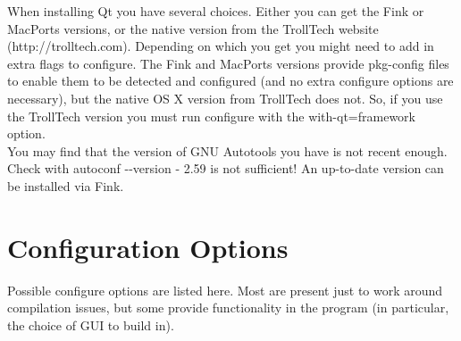When installing Qt you have several choices. Either you can get the Fink or MacPorts versions, or the native version from the TrollTech website (http://trolltech.com). Depending on which you get you might need to add in extra flags to {\sffamily configure}. The Fink and MacPorts versions provide pkg-config files to enable them to be detected and configured (and no extra {\sffamily configure} options are necessary), but the native OS X version from TrollTech does not. So, if you use the TrollTech version you must run {\sffamily configure} with the {\sffamily {-}{-}with-qt=framework} option.\\

You may find that the version of GNU Autotools you have is not recent enough. Check with {\sffamily autoconf {-}{-}version} - 2.59 is not sufficient! An up-to-date version can be installed via Fink.\\

\section{Configuration Options}

Possible {\sffamily configure} options are listed here. Most are present just to work around compilation issues, but some provide functionality in the program (in particular, the choice of GUI to build in).

